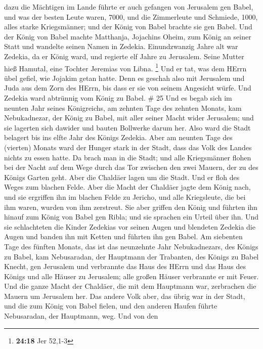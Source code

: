 dazu die Mächtigen im Lande führte er auch gefangen von Jerusalem gen
Babel,  und was der besten Leute waren, 7000, und die
Zimmerleute und Schmiede, 1000, alles starke Kriegsmänner; und der König
von Babel brachte sie gen Babel.  Und der König von Babel
machte Matthanja, Jojachins Oheim, zum König an seiner Statt und
wandelte seinen Namen in Zedekia.  Einundzwanzig Jahre alt
war Zedekia, da er König ward, und regierte elf Jahre zu Jerusalem.
Seine Mutter hieß Hamutal, eine Tochter Jeremias von Libna. \footnote{\textbf{24:18}
  Jer 52,1-3}  Und er tat, was dem HErrn übel gefiel, wie
Jojakim getan hatte.  Denn es geschah also mit Jerusalem
und Juda aus dem Zorn des HErrn, bis dass er sie von seinem Angesicht
würfe. Und Zedekia ward abtrünnig vom König zu Babel. \# 25 
Und es begab sich im neunten Jahr seines Königreichs, am zehnten Tage
des zehnten Monats, kam Nebukadnezar, der König zu Babel, mit aller
seiner Macht wider Jerusalem; und sie lagerten sich dawider und bauten
Bollwerke darum her.  Also ward die Stadt belagert bis ins
elfte Jahr des Königs Zedekia.  Aber am neunten Tage des
(vierten) Monats ward der Hunger stark in der Stadt, dass das Volk des
Landes nichts zu essen hatte.  Da brach man in die Stadt;
und alle Kriegsmänner flohen bei der Nacht auf dem Wege durch das Tor
zwischen den zwei Mauern, der zu des Königs Garten geht. Aber die
Chaldäer lagen um die Stadt. Und er floh des Weges zum blachen Felde.
 Aber die Macht der Chaldäer jagte dem König nach, und sie
ergriffen ihn im blachen Felde zu Jericho, und alle Kriegsleute, die bei
ihm waren, wurden von ihm zerstreut.  Sie aber griffen den
König und führten ihn hinauf zum König von Babel gen Ribla; und sie
sprachen ein Urteil über ihn.  Und sie schlachteten die
Kinder Zedekias vor seinen Augen und blendeten Zedekia die Augen und
banden ihn mit Ketten und führten ihn gen Babel.  Am
siebenten Tage des fünften Monats, das ist das neunzehnte Jahr
Nebukadnezars, des Königs zu Babel, kam Nebusaradan, der Hauptmann der
Trabanten, des Königs zu Babel Knecht, gen Jerusalem  und
verbrannte das Haus des HErrn und das Haus des Königs und alle Häuser zu
Jerusalem; alle großen Häuser verbrannte er mit Feuer.  Und
die ganze Macht der Chaldäer, die mit dem Hauptmann war, zerbrachen die
Mauern um Jerusalem her.  Das andere Volk aber, das übrig
war in der Stadt, und die zum König von Babel fielen, und den anderen
Haufen führte Nebusaradan, der Hauptmann, weg.  Und von den
